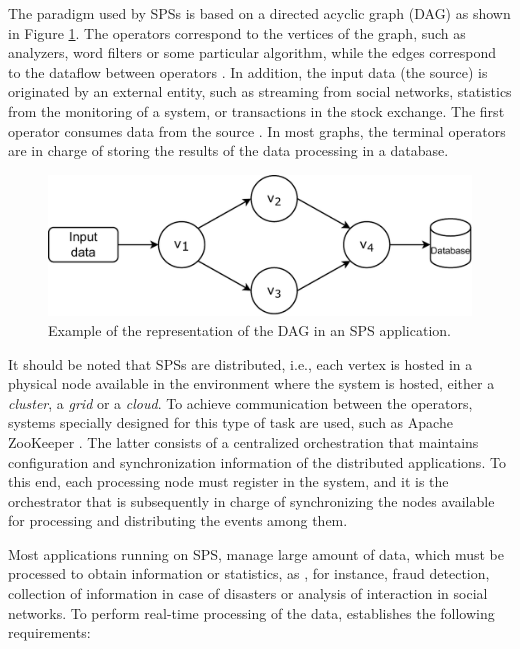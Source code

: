 The paradigm used by SPSs is based on a directed acyclic graph (DAG) as shown in Figure \ref{fig:sps-concept}. The operators correspond to the vertices of the graph, such as analyzers, word filters or some particular algorithm, while the edges correspond to the dataflow between operators \cite{Shahrivari14}. In addition, the input data (the source) is originated by an external entity, such as streaming from social networks, statistics from the monitoring of a system, or transactions in the stock exchange. The first operator consumes data from the source \cite{AppelFFB12}. In most graphs, the terminal operators are in charge of storing the results of the data processing in a database.

\begin{figure}[ht!]
  \centering
    \includegraphics[scale=0.6]{figures/concepts/SPS-Concept.pdf}
  \caption{Example of the representation of the DAG in an SPS application.}
  \label{fig:sps-concept}
\end{figure}

It should be noted that SPSs are distributed, i.e., each vertex is hosted in a physical node available in the environment where the system is hosted, either a \textit{cluster}, a \textit{grid} or a \textit{cloud}. To achieve communication between the operators, systems specially designed for this type of task are used, such as Apache ZooKeeper \cite{HuntKJR10}. The latter consists of a centralized orchestration that maintains configuration and synchronization information of the distributed applications. To this end, each processing node must register in the system, and it is the orchestrator that is subsequently in charge of synchronizing the nodes available for processing and distributing the events among them.

Most applications running on SPS, manage large amount of data, which must be processed to obtain information or statistics, as , for instance, fraud detection, collection of information in case of disasters or analysis of interaction in social networks. To perform real-time processing of the data, \cite{StonebrakerCZ05} establishes the following requirements:


